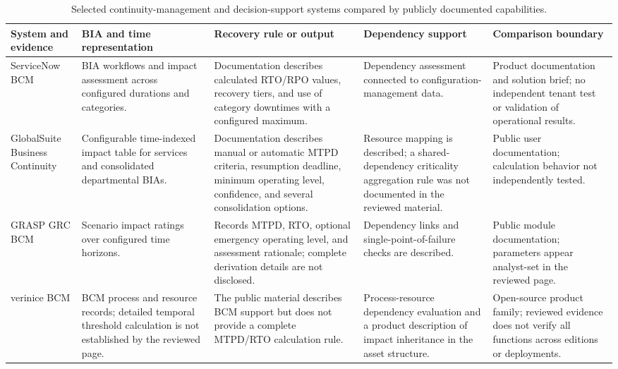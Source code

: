 \begin{table}
\centering
\caption{Selected continuity-management and decision-support systems compared by publicly documented capabilities.}
\label{tab:lr_tool_comparison}
\footnotesize
\renewcommand{\arraystretch}{1.15}
\setlength{\tabcolsep}{4pt}
\begin{tabularx}{\linewidth}{>{\raggedright\arraybackslash}p{2.8cm} >{\raggedright\arraybackslash}X >{\raggedright\arraybackslash}X >{\raggedright\arraybackslash}X >{\raggedright\arraybackslash}X}
\toprule
\textbf{System and evidence} & \textbf{BIA and time representation} & \textbf{Recovery rule or output} & \textbf{Dependency support} & \textbf{Comparison boundary} \\
\midrule
ServiceNow BCM \cite{servicenow2025bia,servicenow2025rto,servicenow2025datasheet} & BIA workflows and impact assessment across configured durations and categories. & Documentation describes calculated RTO/RPO values, recovery tiers, and use of category downtimes with a configured maximum. & Dependency assessment connected to configuration-management data. & Product documentation and solution brief; no independent tenant test or validation of operational results. \\
GlobalSuite Business Continuity \cite{globalsuite2025prebia} & Configurable time-indexed impact table for services and consolidated departmental BIAs. & Documentation describes manual or automatic MTPD criteria, resumption deadline, minimum operating level, confidence, and several consolidation options. & Resource mapping is described; a shared-dependency criticality aggregation rule was not documented in the reviewed material. & Public user documentation; calculation behavior not independently tested. \\
GRASP GRC BCM \cite{grasp2025bia} & Scenario impact ratings over configured time horizons. & Records MTPD, RTO, optional emergency operating level, and assessment rationale; complete derivation details are not disclosed. & Dependency links and single-point-of-failure checks are described. & Public module documentation; parameters appear analyst-set in the reviewed page. \\
verinice BCM \cite{verinice2025bcm} & BCM process and resource records; detailed temporal threshold calculation is not established by the reviewed page. & The public material describes BCM support but does not provide a complete MTPD/RTO calculation rule. & Process-resource dependency evaluation and a product description of impact inheritance in the asset structure. & Open-source product family; reviewed evidence does not verify all functions across editions or deployments. \\

\end{tabularx}
\end{table}

